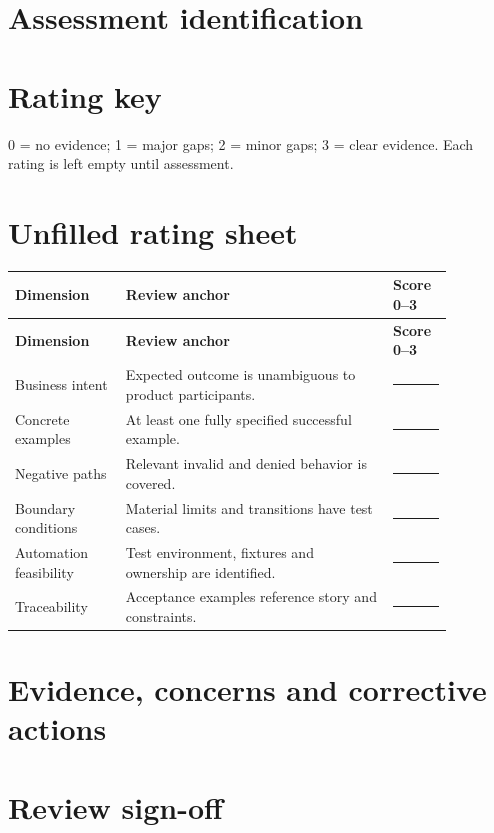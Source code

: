 \documentclass[11pt,letterpaper]{article}
\begin{document}
\section{Assessment identification}
\section{Rating key}
0 = no evidence; 1 = major gaps; 2 = minor gaps; 3 = clear evidence. Each rating is left empty until assessment.

\section{Unfilled rating sheet}
\begin{longtable}{|p{0.22\linewidth}|p{0.53\linewidth}|p{0.12\linewidth}|}\hline
\textbf{Dimension} & \textbf{Review anchor} & \textbf{Score 0--3} \\ \hline\endfirsthead
\textbf{Dimension} & \textbf{Review anchor} & \textbf{Score 0--3} \\ \hline\endhead
Business intent & Expected outcome is unambiguous to product participants. & \rule{0.4in}{0.35pt} \\ \hline
Concrete examples & At least one fully specified successful example. & \rule{0.4in}{0.35pt} \\ \hline
Negative paths & Relevant invalid and denied behavior is covered. & \rule{0.4in}{0.35pt} \\ \hline
Boundary conditions & Material limits and transitions have test cases. & \rule{0.4in}{0.35pt} \\ \hline
Automation feasibility & Test environment, fixtures and ownership are identified. & \rule{0.4in}{0.35pt} \\ \hline
Traceability & Acceptance examples reference story and constraints. & \rule{0.4in}{0.35pt} \\ \hline
\end{longtable}
\section{Evidence, concerns and corrective actions}
\section{Review sign-off}
\end{document}
